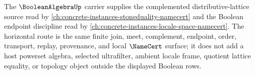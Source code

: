 The $\BooleanAlgebraUp$ carrier supplies the complemented distributive-lattice source read by \autoref{ch:concrete-instances-stoneduality-namecert} and the Boolean endpoint discipline read by \autoref{ch:concrete-instances-locale-space-namecert}. The horizontal route is the same finite join, meet, complement, endpoint, order, transport, replay, provenance, and local $\NameCert$ surface; it does not add a host powerset algebra, selected ultrafilter, ambient locale frame, quotient lattice equality, or topology object outside the displayed Boolean rows.
